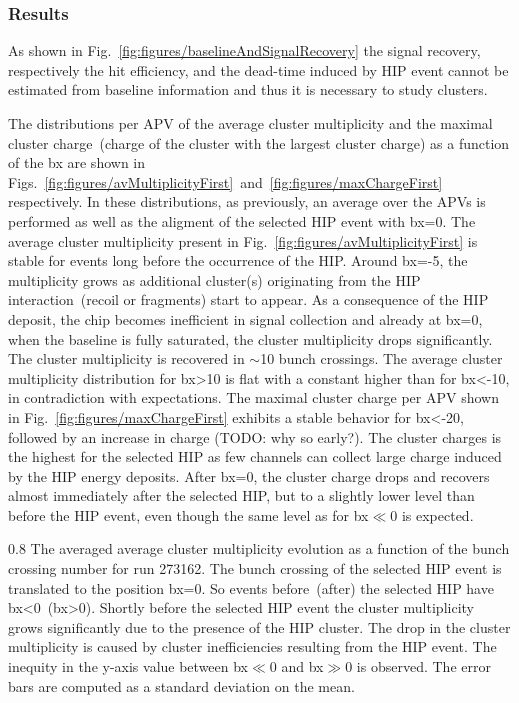 \subsubsection{Results}

As shown in Fig.~\ref{fig:figures/baselineAndSignalRecovery} the signal recovery, respectively the hit efficiency, and the dead-time  induced by HIP event cannot be estimated from baseline information and thus it is necessary to study clusters.

The distributions per APV of the average cluster multiplicity and the maximal cluster charge~(charge of the cluster with the largest cluster charge) as a function of the bx are shown in Figs.~\ref{fig:figures/avMultiplicityFirst}~and~\ref{fig:figures/maxChargeFirst} respectively. In these distributions, as previously, an average over the APVs is performed as well as the aligment of the selected HIP event with bx=0. The average cluster multiplicity present in Fig.~\ref{fig:figures/avMultiplicityFirst} is stable for events long before the occurrence of the HIP. Around bx=-5, the multiplicity grows as additional cluster(s) originating from the HIP interaction~(recoil or fragments) start to appear. As a consequence of the HIP deposit, the chip becomes inefficient in signal collection and already at bx=0, when the baseline is fully saturated, the cluster multiplicity drops significantly. The cluster multiplicity is recovered in $\sim$10 bunch crossings. The average cluster multiplicity distribution for bx>10 is flat with a constant higher than for bx<-10, in contradiction with expectations. The maximal cluster charge per APV shown in Fig.~\ref{fig:figures/maxChargeFirst} exhibits a stable behavior for bx<-20, followed by an increase in charge (TODO: why so early?). The cluster charges is the highest for the selected HIP as few channels can collect large charge induced by the HIP energy deposits. After bx=0, the cluster charge drops and recovers almost immediately after the selected HIP, but to a slightly lower level than before the HIP event, even though the same level as for bx$\ll$0 is expected. 



                 {0.8}       %
                 {The averaged average cluster multiplicity evolution as a function of the bunch crossing number for run 273162. The bunch crossing of the selected HIP event is translated to the position bx=0. So events before~(after) the selected HIP have bx<0~(bx>0). Shortly before the selected HIP event the cluster multiplicity grows significantly due to the presence of the HIP cluster. The drop in the cluster multiplicity is caused by cluster inefficiencies resulting from the HIP event. The inequity in the y-axis value between bx$\ll$0 and bx$\gg$0 is observed. The error bars are computed as a standard deviation on the mean. } %


